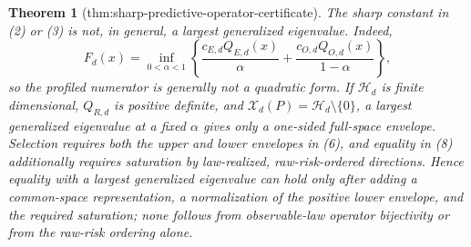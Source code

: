\documentclass{article}
\newtheorem{theorem}{Theorem}
\begin{document}
\begin{theorem}[thm:sharp-predictive-operator-certificate]
The sharp constant in (2) or (3) is not, in general, a largest generalized eigenvalue. Indeed,
\[
 F_d(x)=\inf_{0<\alpha<1}\left\{
 \frac{c_{E,d}Q_{E,d}(x)}{\alpha}
 +\frac{c_{O,d}Q_{O,d}(x)}{1-\alpha}\right\}, \tag{9}
\]
so the profiled numerator is generally not a quadratic form. If \(\mathcal H_d\) is finite dimensional, \(Q_{R,d}\) is positive definite, and \(\mathcal X_d(P)=\mathcal H_d\setminus\{0\}\), a largest generalized eigenvalue at a fixed \(\alpha\) gives only a one-sided full-space envelope. Selection requires both the upper and lower envelopes in (6), and equality in (8) additionally requires saturation by law-realized, raw-risk-ordered directions. Hence equality with a largest generalized eigenvalue can hold only after adding a common-space representation, a normalization of the positive lower envelope, and the required saturation; none follows from observable-law operator bijectivity or from the raw-risk ordering alone.
\end{theorem}
\end{document}
